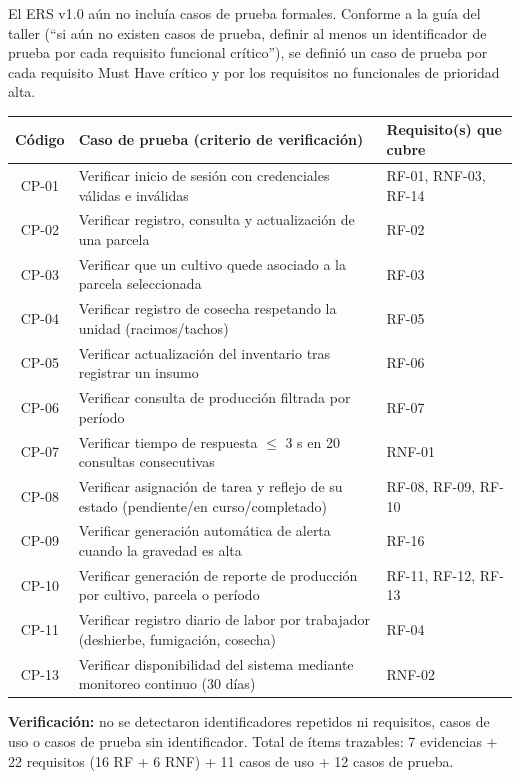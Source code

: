 \documentclass[12pt,a4paper]{article}
\begin{document}
El ERS v1.0 aún no incluía casos de prueba formales. Conforme a la guía del taller (``si aún no existen casos de prueba, definir al menos un identificador de prueba por cada requisito funcional crítico''), se definió un caso de prueba por cada requisito Must Have crítico y por los requisitos no funcionales de prioridad alta.

\begin{longtable}{@{}cll@{}}
\toprule
\textbf{Código} & \textbf{Caso de prueba (criterio de verificación)} & \textbf{Requisito(s) que cubre} \\
\midrule
\endhead
CP-01 & Verificar inicio de sesión con credenciales válidas e inválidas & RF-01, RNF-03, RF-14 \\
CP-02 & Verificar registro, consulta y actualización de una parcela & RF-02 \\
CP-03 & Verificar que un cultivo quede asociado a la parcela seleccionada & RF-03 \\
CP-04 & Verificar registro de cosecha respetando la unidad (racimos/tachos) & RF-05 \\
CP-05 & Verificar actualización del inventario tras registrar un insumo & RF-06 \\
CP-06 & Verificar consulta de producción filtrada por período & RF-07 \\
CP-07 & Verificar tiempo de respuesta $\leq$ 3 s en 20 consultas consecutivas & RNF-01 \\
CP-08 & Verificar asignación de tarea y reflejo de su estado (pendiente/en curso/completado) & RF-08, RF-09, RF-10 \\
CP-09 & Verificar generación automática de alerta cuando la gravedad es alta & RF-16 \\
CP-10 & Verificar generación de reporte de producción por cultivo, parcela o período & RF-11, RF-12, RF-13 \\
CP-11 & Verificar registro diario de labor por trabajador (deshierbe, fumigación, cosecha) & RF-04 \\
CP-13 & Verificar disponibilidad del sistema mediante monitoreo continuo (30 días) & RNF-02 \\
\bottomrule
\end{longtable}

\textbf{Verificación:} no se detectaron identificadores repetidos ni requisitos, casos de uso o casos de prueba sin identificador. Total de ítems trazables: 7 evidencias + 22 requisitos (16 RF + 6 RNF) + 11 casos de uso + 12 casos de prueba.

\end{document}
